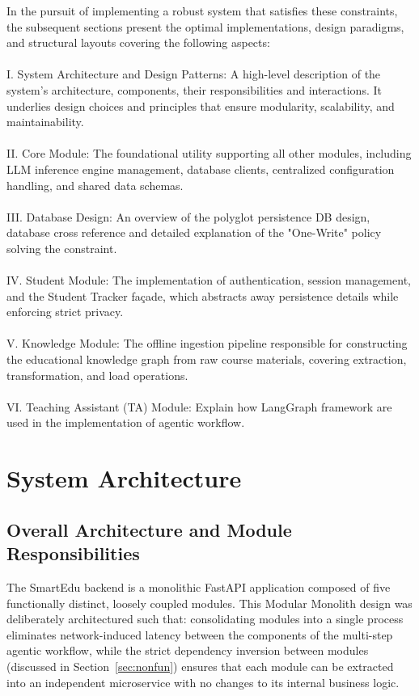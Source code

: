 In the pursuit of implementing a robust system that satisfies these constraints, the subsequent sections present the optimal implementations, 
design paradigms, and structural layouts covering the following aspects:
\\\\{I. System Architecture and Design Patterns:} A high-level description of the system's architecture, components, their responsibilities and 
    interactions. It underlies design choices and principles that ensure modularity, scalability, and maintainability.
  \\\\{II. Core Module:} The foundational utility supporting all other modules, including LLM inference engine management, database clients, 
    centralized configuration handling, and shared data schemas.
\\\\{III. Database Design:} An overview of the polyglot persistence DB design, database cross reference and detailed explanation of the "One-Write" 
    policy solving the constraint.
\\\\{IV. Student Module:} The implementation of authentication, session management, and the Student Tracker façade, which abstracts away persistence details 
    while enforcing strict privacy.
\\\\{V. Knowledge Module:} The offline ingestion pipeline responsible for constructing the educational knowledge graph from raw course materials, covering extraction, 
transformation, and load operations.
\\\\{VI. Teaching Assistant (TA) Module:} Explain how LangGraph framework are used in the implementation of agentic workflow.
\section{System Architecture}\label{sec:arch}
\subsection{Overall Architecture and Module Responsibilities}

The SmartEdu backend is a monolithic FastAPI application composed of five functionally distinct, loosely coupled modules. 
This {Modular Monolith} design was deliberately architectured such that: consolidating modules into a 
single process eliminates network-induced latency between the components of the multi-step agentic workflow, while the strict dependency 
inversion between modules (discussed in Section~\ref{sec:nonfun}) ensures that each module can be extracted into an independent microservice 
with no changes to its internal business logic.

